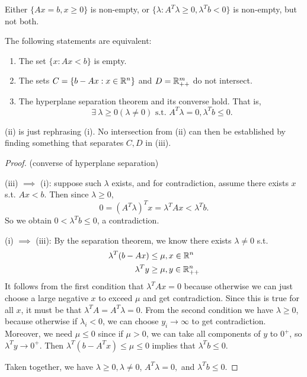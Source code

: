 \documentclass[class=article,crop=false]{standalone}
\begin{document}
\begin{eg}
Either $ \{Ax=b,x\geq 0\} $ is non-empty, or $ \{\lambda: A^{T} \lambda\geq 0, \lambda^{T}b<0\} $ is non-empty, but not both.
\end{eg}
\begin{thm}
The following statements are equivalent:
\begin{enumerate}[label=(\roman*)]
	\item The set $ \{x: Ax<b\} $ is empty.
	\item The sets $ C = \{b-Ax : x \in \mathbb{R}^{n}\} $ and $ D = \mathbb{R}_{++}^{m}$ do not intersect.
	\item The hyperplane separation theorem and its converse hold. That is,
		\[
			\ \exists \ \lambda \geq 0 ( \lambda \neq 0) \text{ s.t. } A^{T} \lambda = 0, \lambda ^{T} b \leq 0 
		.\] 
\end{enumerate}
\end{thm}
\begin{intuition}
	(ii) is just rephrasing (i). No intersection from (ii) can then be established by finding something that separates $ C,D$ in (iii).
\end{intuition}
\begin{proof}(converse of hyperplane separation)

	(iii) $ \implies$ (i): suppose such $ \lambda$ exists, and for contradiction, assume there exists $ x$  s.t. $ Ax < b$. Then since $ \lambda \geq 0$,
\[
	0= (A^{T} \lambda)^{T} x = \lambda^{T} Ax < \lambda ^{T} b
.\] 
So we obtain $ 0< \lambda^{T} b \leq 0$, a contradiction.

(i) $ \implies$ (iii): By the separation theorem, we know there exists $ \lambda \neq 0$ s.t. 
\begin{align*}
	\lambda^{T}(b-Ax) &\leq \mu, x \in \mathbb{R}^{n}\\
	\lambda^{T} y &\geq \mu, y \in \mathbb{R}_{++}^{n}
\end{align*}
It follows from the first condition that $ \lambda^{T}Ax =0$ because otherwise we can just choose a large negative $ x$ to exceed $ \mu$ and get contradiction. Since this is true for all $ x$, it must be that  $ \lambda^{T} A = A^{T} \lambda =0$. From the second condition we have $ \lambda \geq 0$, because otherwise if $ \lambda_i<0$, we can choose $ y_i \to \infty$ to get contradiction. Moreover, we need $ \mu \leq 0$ since if $ \mu>0$, we can take all components of $ y $ to $ 0^{+} $, so $ \lambda^{T} y \to 0^{+} $. Then $ \lambda^{T}(b-A^{T}x)\leq \mu \leq 0$ implies that $ \lambda^{T} b \leq 0$.

Taken together, we have $ \lambda \geq 0, \lambda \neq 0$, $ A^{T} \lambda =0,$ and $ \lambda^{T}b \leq 0$.
\end{proof}
\newpage
\end{document}
